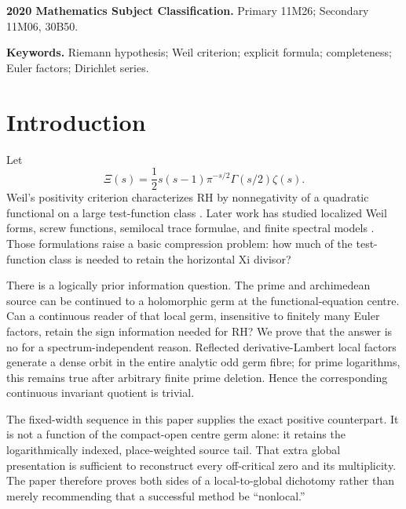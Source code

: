 \documentclass[11pt]{article}
\begin{document}
\begin{abstract}
This does not prove RH.  It proves a sharp dichotomy: compact-open local continuation
annihilates continuous finite-factor-insensitive RH information, whereas one explicit
global weighted-tail sequence retains the entire off-critical divisor and quantitatively
classifies every possible failure.
\end{abstract}

\medskip
\noindent\textbf{2020 Mathematics Subject Classification.}
Primary 11M26; Secondary 11M06, 30B50.

\noindent\textbf{Keywords.}
Riemann hypothesis; Weil criterion; explicit formula; completeness; Euler factors;
Dirichlet series.

\section{Introduction}

Let
\[
 \Xi(s)=\frac12s(s-1)\pi^{-s/2}\Gamma(s/2)\zeta(s).
 \tag{1.1}
\]
Weil's positivity criterion characterizes RH by nonnegativity of a quadratic functional on a
large test-function class \cite{Weil1952,Bombieri2000}.  Later work has studied localized Weil
forms, screw functions, semilocal trace formulae, and finite spectral models
\cite{Connes1999,ConnesConsani2021,Suzuki2023,Suzuki2025,Suzuki2026,CCM2025,Groskin2026}.
Those formulations raise a basic compression problem: how much of the test-function class is
needed to retain the horizontal Xi divisor?

There is a logically prior information question.  The prime and archimedean source can be
continued to a holomorphic germ at the functional-equation centre.  Can a continuous reader of
that local germ, insensitive to finitely many Euler factors, retain the sign information needed
for RH?  We prove that the answer is no for a spectrum-independent reason.  Reflected
derivative-Lambert local factors generate a dense orbit in the entire analytic odd germ fibre;
for prime logarithms, this remains true after arbitrary finite prime deletion.  Hence the
corresponding continuous invariant quotient is trivial.

The fixed-width sequence in this paper supplies the exact positive counterpart.  It is not a
function of the compact-open centre germ alone: it retains the logarithmically indexed,
place-weighted source tail.  That extra global presentation is sufficient to reconstruct every
off-critical zero and its multiplicity.  The paper therefore proves both sides of a
local-to-global dichotomy rather than merely recommending that a successful method be
``nonlocal.''
\end{document}
